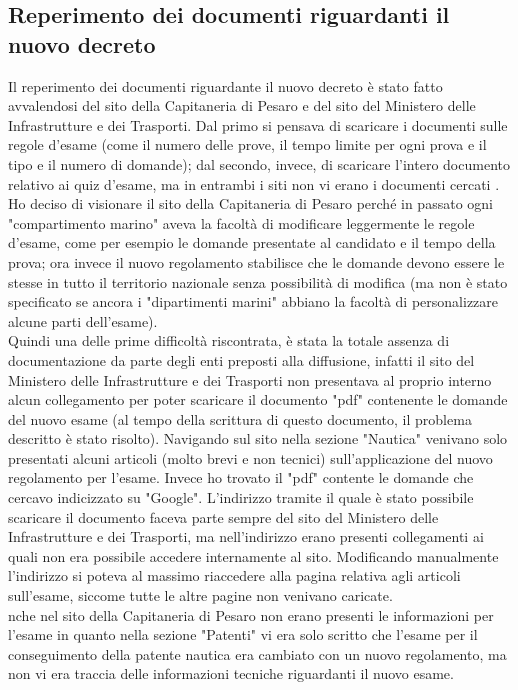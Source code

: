 \subsection{Reperimento dei documenti riguardanti il nuovo decreto}
Il reperimento dei documenti riguardante il nuovo decreto è stato fatto avvalendosi del sito della Capitaneria di Pesaro e del sito del Ministero delle Infrastrutture e dei Trasporti. Dal primo si pensava di scaricare i documenti sulle regole d'esame (come il numero delle prove, il tempo limite per ogni prova e il tipo e il numero di domande); dal secondo, invece,  di scaricare l'intero documento relativo ai quiz d'esame, ma in entrambi i siti non vi erano i documenti cercati . Ho deciso di visionare il sito della Capitaneria di Pesaro perché in passato ogni "compartimento marino" aveva la facoltà di modificare leggermente le regole d'esame, come per esempio le domande presentate al candidato e il tempo della prova; ora invece  il nuovo regolamento stabilisce che le domande devono essere le stesse in tutto il territorio nazionale senza possibilità di modifica (ma non è stato specificato se ancora i "dipartimenti marini" abbiano la facoltà di personalizzare alcune parti dell'esame).\\
Quindi una delle prime difficoltà riscontrata, è stata la totale assenza di documentazione da parte degli enti preposti alla diffusione, infatti  il sito del Ministero delle Infrastrutture e dei Trasporti non presentava al proprio interno alcun collegamento per poter scaricare il documento "pdf" contenente le domande del nuovo esame (al tempo della scrittura di questo documento, il problema descritto è stato risolto). Navigando sul sito nella sezione "Nautica" venivano solo presentati alcuni articoli (molto brevi e non tecnici)  sull'applicazione del nuovo regolamento per l'esame. Invece ho trovato il "pdf" contente le domande che cercavo indicizzato su "Google". L'indirizzo  tramite il quale è stato possibile scaricare il documento faceva parte sempre del sito del Ministero delle Infrastrutture e dei Trasporti, ma nell'indirizzo erano presenti collegamenti ai quali non era possibile accedere internamente al sito. Modificando manualmente l'indirizzo  si poteva al massimo riaccedere alla pagina relativa agli articoli sull'esame, siccome tutte le altre pagine non venivano caricate.\\
nche nel sito della Capitaneria di Pesaro non erano presenti le informazioni per l'esame in quanto nella sezione "Patenti" vi era solo scritto che l'esame per il conseguimento della patente nautica era cambiato con un nuovo regolamento, ma non vi era traccia delle informazioni tecniche riguardanti il nuovo esame.\\
